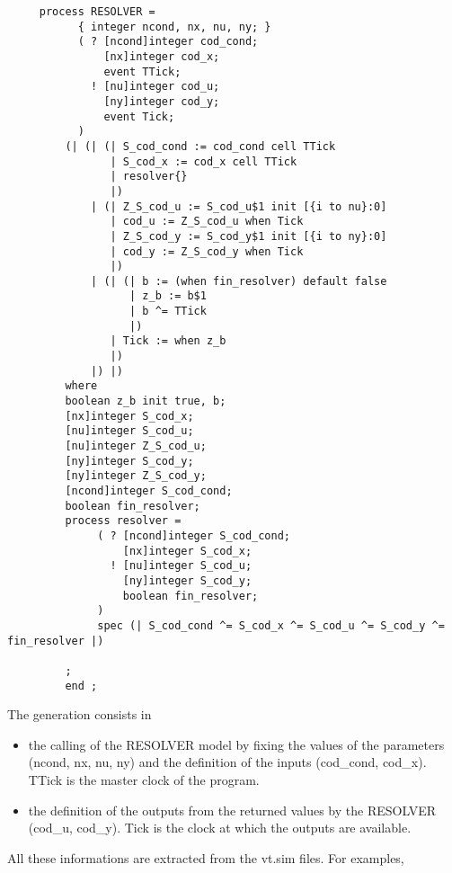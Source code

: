 \footnotesize\begin{verbatim}     process RESOLVER =
           { integer ncond, nx, nu, ny; }
           ( ? [ncond]integer cod_cond;
               [nx]integer cod_x;
               event TTick;
             ! [nu]integer cod_u;
               [ny]integer cod_y;
               event Tick;
           )
         (| (| (| S_cod_cond := cod_cond cell TTick
                | S_cod_x := cod_x cell TTick
                | resolver{}
                |)
             | (| Z_S_cod_u := S_cod_u$1 init [{i to nu}:0]
                | cod_u := Z_S_cod_u when Tick
                | Z_S_cod_y := S_cod_y$1 init [{i to ny}:0]
                | cod_y := Z_S_cod_y when Tick
                |)
             | (| (| b := (when fin_resolver) default false
                   | z_b := b$1
                   | b ^= TTick
                   |)
                | Tick := when z_b
                |)
             |) |)
         where 
         boolean z_b init true, b;
         [nx]integer S_cod_x;
         [nu]integer S_cod_u;
         [nu]integer Z_S_cod_u;
         [ny]integer S_cod_y;
         [ny]integer Z_S_cod_y;
         [ncond]integer S_cod_cond;
         boolean fin_resolver;
         process resolver =
              ( ? [ncond]integer S_cod_cond;
                  [nx]integer S_cod_x;
                ! [nu]integer S_cod_u;
                  [ny]integer S_cod_y;
                  boolean fin_resolver;
              )
              spec (| S_cod_cond ^= S_cod_x ^= S_cod_u ^= S_cod_y ^= fin_resolver |)
         
         ; 
         end ; 
\end{verbatim}
\normalsize


The generation consists in\begin{itemize}
\item the calling of the RESOLVER model by fixing the values of the parameters (ncond, nx, nu, ny) and the definition of the inputs (cod\_\-cond, cod\_\-x). TTick is the master clock of the program.\item the definition of the outputs from the returned values by the RESOLVER (cod\_\-u, cod\_\-y). Tick is the clock at which the outputs are available.\end{itemize}


All these informations are extracted from the vt.sim files. For examples,

